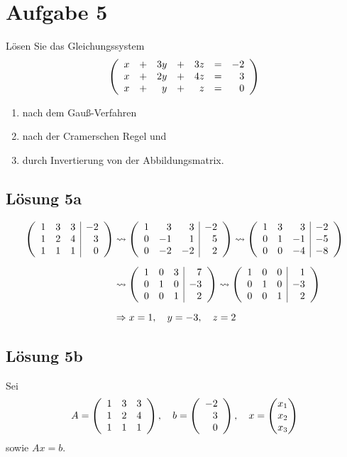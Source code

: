 \documentclass[main.tex]{subfiles}
\begin{document}
\section{Aufgabe 5}
Lösen Sie das Gleichungssystem
$$
    \eqmatrix{rcrcrcr}{
        x & + & 3y & + & 3z & = & -2 \\
        x & + & 2y & + & 4z & = &  3 \\
        x & + &  y & + &  z & = &  0 \\
    }
$$
\begin{enumerate}
    \item nach dem Gauß-Verfahren
    \item nach der Cramerschen Regel und
    \item durch Invertierung von der Abbildungsmatrix.
\end{enumerate}

\subsection{Lösung 5a}
\begin{align*}
    \eqmatrix{rrr|r}{
        1 & 3 & 3 & -2 \\
        1 & 2 & 4 &  3 \\
        1 & 1 & 1 &  0 \\
    } &\leadsto 
    \eqmatrix{rrr|r}{
        1 &  3 &  3 & -2 \\
        0 & -1 &  1 &  5 \\
        0 & -2 & -2 &  2 \\
    } \leadsto 
    \eqmatrix{rrr|r}{
        1 &  3 &  3 & -2 \\
        0 &  1 & -1 & -5 \\
        0 &  0 & -4 & -8 \\
    } \\[2mm]
    &\leadsto
    \eqmatrix{rrr|r}{
        1 & 0 & 3 &  7 \\
        0 & 1 & 0 & -3 \\
        0 & 0 & 1 &  2 \\
    } \leadsto
    \eqmatrix{rrr|r}{
        1 & 0 & 0 &  1 \\
        0 & 1 & 0 & -3 \\
        0 & 0 & 1 &  2 \\
    } \\[2mm]
    &\Rightarrow x=1,\quad y=-3,\quad z=2
\end{align*}

\subsection{Lösung 5b}
Sei 
$$
    A = \eqmatrix{rrr}{
        1 & 3 & 3\\
        1 & 2 & 4\\
        1 & 1 & 1\\
    }, \quad
    b = \eqmatrix{r}{-2 \\ 3 \\ 0}, \quad
    x = \vektor{x_1 \\ x_2 \\ x_3}
$$
sowie $Ax=b$. 
\end{document}
